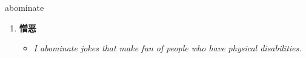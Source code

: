 
\begin{frame}
{\huge abominate}
\begin{center}
\begin{enumerate}\Large
  \item \textbf{憎恶}
  \begin{itemize}
    \item \em{\Large{I abominate jokes that make fun of people who have physical disabilities.}}
  \end{itemize}
\end{enumerate}
\end{center}
\end{frame}

